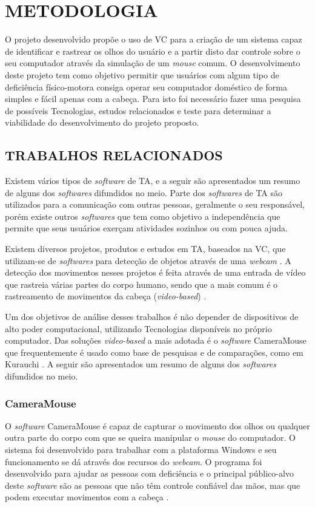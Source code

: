 \chapter{METODOLOGIA}\label{CAP3}
O projeto desenvolvido propõe o uso de VC para a criação de um sistema capaz de identificar e rastrear os olhos do usuário e a partir disto dar controle sobre o seu computador através da simulação de um \textit{mouse} comum.
	O desenvolvimento deste projeto tem como objetivo permitir que usuários com algum tipo de deficiência físico-motora consiga operar seu computador doméstico de forma simples e fácil apenas com a cabeça. Para isto foi necessário fazer uma pesquisa de possíveis Tecnologias, estudos relacionados e teste para   determinar a viabilidade do desenvolvimento do projeto proposto.
    
\section{TRABALHOS RELACIONADOS}\label{Sub:trabalhos-relacionados}
Existem vários tipos de  \textit{software} de TA, e a seguir são apresentados um resumo de alguns dos \textit{softwares} difundidos no meio. Parte dos \textit{softwares} de TA são utilizados para a comunicação com outras pessoas, geralmente o seu responsável, porém existe outros \textit{softwares} que tem como objetivo a independência que permite que seus usuários exerçam atividades sozinhos ou com pouca ajuda. 

Existem diversos projetos, produtos e estudos em TA, baseados na VC, que utilizam-se de \textit{softwares} para detecção de objetos através de uma \textit{webcam} \cite{ramos2016letras,gips2000camera,bian2016facial,marnik2014blinkmouse}. A detecção dos movimentos nesses projetos é feita através de uma entrada de vídeo que rastreia várias partes do corpo humano, sendo que a mais comum é o rastreamento de movimentos da cabeça (\textit{video-based}) \cite{al2013eye}. 

Um dos objetivos de análise desses trabalhos é não depender de dispositivos de alto poder computacional, utilizando Tecnologias disponíveis no próprio computador. Das soluções \textit{video-based} a mais adotada é o \textit{software} CameraMouse \cite{gips2000camera} que frequentemente é usado como base de pesquisas e de comparações, como em Kurauchi \cite{kurauchi2015hmagic}. A seguir são apresentados um resumo de alguns dos \textit{softwares} difundidos no meio.

\subsection{CameraMouse}
O \textit{software} CameraMouse é capaz de capturar o movimento dos olhos ou qualquer outra parte do corpo com que se queira manipular o \textit{mouse} do computador. O sistema foi desenvolvido para trabalhar com a plataforma Windows e seu funcionamento se dá através dos recursos do \textit{webcam}. O programa foi desenvolvido para ajudar as pessoas com deficiência e o principal público-alvo deste \textit{software} são as pessoas que não têm controle confiável das mãos, mas que podem executar movimentos com a cabeça .


